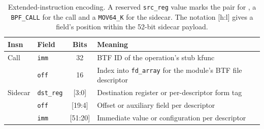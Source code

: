 \begin{table}[t]
\centering
\small
\caption{Extended-instruction encoding. A reserved \texttt{src\_reg} value marks the pair for \tool, a \texttt{BPF\_CALL} for the call and a \texttt{MOV64\_K} for the sidecar. The notation [h:l] gives a field's position within the 52-bit sidecar payload.}
\label{tab:encoding}
\begin{tabular}{@{}llcp{}@{}}
\toprule
Insn & Field & Bits & Meaning \tabularnewline
\midrule
Call & \texttt{imm} & 32 & \raggedright BTF ID of the operation's stub kfunc \tabularnewline
 & \texttt{off} & 16 & \raggedright Index into \texttt{fd\_array} for the module's BTF file descriptor \tabularnewline
\midrule
Sidecar & \texttt{dst\_reg} & [3:0] & \raggedright Destination register or per-descriptor form tag \tabularnewline
 & \texttt{off} & [19:4] & \raggedright Offset or auxiliary field per descriptor \tabularnewline
 & \texttt{imm} & [51:20] & \raggedright Immediate value or configuration per descriptor \tabularnewline
\bottomrule
\end{tabular}
\end{table}
